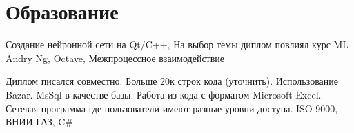 \documentclass[a4paper]{curricula-vitae}
\begin{document}
\begin{minipage}[t]{0.66\textwidth}
\insertspace

\section{Образование} 


Создание нейронной сети на Qt/C++, На выбор темы диплом повлиял курс ML Andry Ng, Octave,
Межпроцессное взаимодействие

\insertspace


Диплом писался совместно. Больше 20к строк кода (уточнить). Использование Bazar.
MsSql в качестве базы. Работа из кода с форматом Microsoft Excel.
Сетевая программа где пользователи имеют разные уровни доступа.
ISO 9000, ВНИИ ГАЗ, C\#

\insertspace

\end{minipage} %

\end{document}
